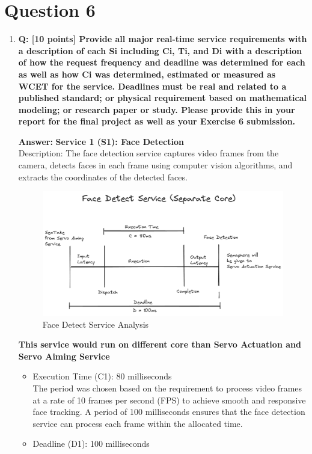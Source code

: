 \documentclass[a4paper,11pt]{article}%
\newenvironment{qanda}{\setlength{\parindent}{0pt}}{\bigskip}
\newcommand{\Q}{\bigskip\bfseries Q: }
\newcommand{\A}{\par\textbf{Answer: } \normalfont}
\begin{document}
\begin{qanda}
	\section{Question 6}
	\begin{enumerate}
		\item[] \Q [10 points] Provide all major real-time service requirements with a description of each
			Si including Ci, Ti, and Di with a description of how the request frequency and deadline was
			determined for each as well as how Ci was determined, estimated or measured as WCET for
			the service. Deadlines must be real and related to a published standard; or physical
			requirement based on mathematical modeling; or research paper or study. Please provide this
			in your report for the final project as well as your Exercise 6 submission.
			\A \textbf{Service 1 (S1): Face Detection}\\
			Description: The face detection service captures video frames from the camera, detects faces in each frame using computer vision algorithms, and extracts the coordinates of the detected faces.
			\begin{figure}[H]
				\centering
				\includegraphics[scale=0.4]{figures/face_detect_service.png}
				\caption{Face Detect Service Analysis}
			\end{figure}
			\textbf{This service would run on different core than Servo Actuation and Servo Aiming Service}
			\begin{itemize}
				\item[]Execution Time (C1): 80 milliseconds\\
				The period was chosen based on the requirement to process video frames at a rate of 10 frames per second (FPS) to achieve smooth and responsive face tracking. A period of 100 milliseconds ensures that the face detection service can process each frame within the allocated time.
				\item[] Deadline (D1): 100 milliseconds\\

\end{itemize}
\end{enumerate}
\end{qanda}
\end{document}
